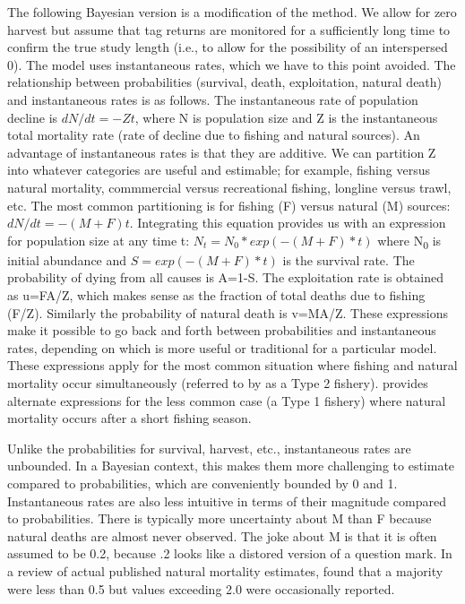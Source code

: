 \documentclass[
]{krantz}
\begin{document}
The following Bayesian version is a modification of the \citet{hearn.etal1987} method. We allow for zero harvest but assume that tag returns are monitored for a sufficiently long time to confirm the true study length (i.e., to allow for the possibility of an interspersed 0). The \citet{hearn.etal1987} model uses instantaneous rates, which we have to this point avoided. The relationship between probabilities (survival, death, exploitation, natural death) and instantaneous rates is as follows. The instantaneous rate of population decline is \(dN/dt = -Zt\), where N is population size and Z is the instantaneous total mortality rate (rate of decline due to fishing and natural sources). An advantage of instantaneous rates is that they are additive. We can partition Z into whatever categories are useful and estimable; for example, fishing versus natural mortality, commmercial versus recreational fishing, longline versus trawl, etc. The most common partitioning is for fishing (F) versus natural (M) sources: \(dN/dt = -(M+F)t\). Integrating this equation provides us with an expression for population size at any time t:
\(N_t = N_0 * exp(-(M+F)*t)\)
where N\textsubscript{0} is initial abundance and \(S=exp(-(M+F)*t)\) is the survival rate. The probability of dying from all causes is A=1-S. The exploitation rate is obtained as u=FA/Z, which makes sense as the fraction of total deaths due to fishing (F/Z). Similarly the probability of natural death is v=MA/Z. These expressions make it possible to go back and forth between probabilities and instantaneous rates, depending on which is more useful or traditional for a particular model. These expressions apply for the most common situation where fishing and natural mortality occur simultaneously (referred to by \citet{ricker1975} as a Type 2 fishery). \citet{ricker1975} provides alternate expressions for the less common case (a Type 1 fishery) where natural mortality occurs after a short fishing season.

Unlike the probabilities for survival, harvest, etc., instantaneous rates are unbounded. In a Bayesian context, this makes them more challenging to estimate compared to probabilities, which are conveniently bounded by 0 and 1. Instantaneous rates are also less intuitive in terms of their magnitude compared to probabilities. There is typically more uncertainty about M than F because natural deaths are almost never observed. The joke about M is that it is often assumed to be 0.2, because .2 looks like a distored version of a question mark. In a review of actual published natural mortality estimates, \citet{vetter1988} found that a majority were less than 0.5 but values exceeding 2.0 were occasionally reported.
\end{document}
